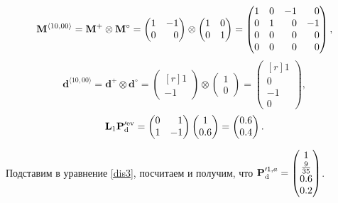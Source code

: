 \begin{equation*}
\M^{\langle 10, 00 \rangle} = \M^+ \otimes \M^\circ = 
\begin{pmatrix*}[r] 1 & -1 \\ 0 & 0 \end{pmatrix*} \otimes
\begin{pmatrix} 1 & 0 \\ 0 & 1\end{pmatrix} = 
\begin{pmatrix*}[r] 1 & 0 & -1 & 0 \\ 0 & 1 & 0 & -1 \\ 0 & 0 & 0 & 0 \\ 0 & 0 & 0 & 0 \end{pmatrix*},
\end{equation*}
\begin{equation*}
\mathbf{d}^{\langle 10, 00 \rangle} = \mathbf{d}^+ \otimes \mathbf{d}^\circ = 
\begin{pmatrix*}[r] 1 \\ -1 \end{pmatrix*} \otimes \begin{pmatrix}  1 \\ 0 \end{pmatrix} = \begin{pmatrix*}[r]  1 \\ 0 \\ -1 \\ 0 \end{pmatrix*},
\end{equation*}
\begin{equation*}
\mathbf{L}_1\Pd^{\prime \ev} = \begin{pmatrix*}[r] 0 & 1 \\ 1 & -1 \end{pmatrix*} \begin{pmatrix}1 \\ 0.6\end{pmatrix} = \begin{pmatrix}
0.6 \\ 0.4 \end{pmatrix}.
\end{equation*}

Подставим в уравнение \ref{dis3}, посчитаем и получим, что $\mathbf{P}_\mathrm{d}^{\prime 1,a} = \begin{pmatrix}
1 \\  \frac{9}{35} \\ 0.6 \\ 0.2
\end{pmatrix}$.

